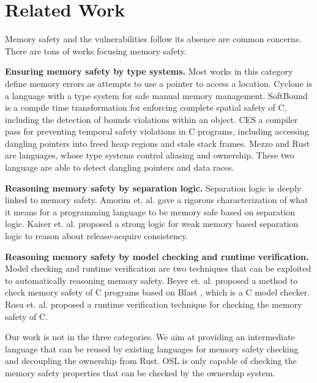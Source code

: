 \documentclass[runningheads]{llncs}
\begin{document}
\section{Related Work}
\label{sec:relatedwork}

Memory safety and the vulnerabilities follow its absence are common concerns. There are tons of works focusing memory safety.


\textbf{Ensuring memory safety by type systems.} Most works in this category define memory errors as attempts to use a pointer to access a location. Cyclone \cite{DBLP:journals/scp/SwamyHMGJ06} is a language with a type system for safe manual memory management.  SoftBound \cite {DBLP:conf/pldi/NagarakatteZMZ09} is a compile time transformation for enforcing complete spatial safety of C, including the detection of bounds violations within an object. CES \cite{DBLP:conf/iwmm/NagarakatteZMZ10} a compiler pass for preventing temporal safety violations in C programs, including accessing dangling pointers into freed heap regions and stale stack frames. 
Mezzo \cite{DBLP:conf/icfp/PottierP13} and Rust \cite{rusthome} are languages, whose type systems control aliasing and ownership. These two language are able to detect dangling pointers and data races. 


\textbf{Reasoning memory safety by separation logic.}
Separation logic \cite{DBLP:conf/lics/Reynolds02}\cite{DBLP:conf/fossacs/YangO02}  is deeply linked to memory safety.
Amorim et. al. \cite{DBLP:conf/post/AmorimHP18} gave a rigorous characterization of what it means for a programming language to be memory safe based on separation logic. Kaiser et. al. \cite{DBLP:conf/ecoop/KaiserDDLV17} proposed a strong logic for weak memory based separation logic to reason about release-acquire consistency.

\textbf{Reasoning memory safety  by model checking and runtime verification.} Model checking and runtime verification
are two techniques that can be exploited to automatically reasoning memory safety.
Beyer et. al. proposed a method to check memory safety of C programs based on Blast \cite{DBLP:conf/spin/HenzingerJMS03}, which is a C model checker.
Rosu et. al. \cite{DBLP:conf/rv/RosuSS09} proposed a runtime  verification technique for checking the memory safety of C.

Our work is not in the three categories. We aim at providing an intermediate language that can be reused by existing languages for memory safety checking and decoupling the ownership from Rust. OSL is only capable of checking the memory safety properties that can be checked by 
the ownership system.
\end{document}

